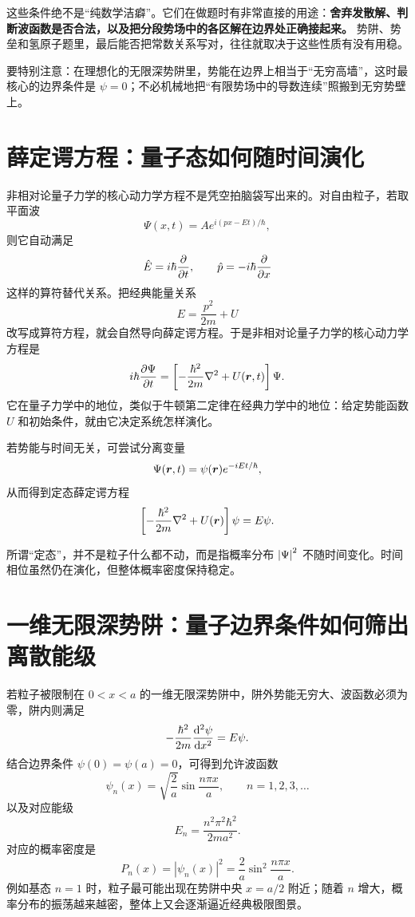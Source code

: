 \documentclass[lang=cn,11pt]{elegantbook}
\begin{document}
这些条件绝不是“纯数学洁癖”。它们在做题时有非常直接的用途：\textbf{舍弃发散解、判断波函数是否合法，以及把分段势场中的各区解在边界处正确接起来。} 势阱、势垒和氢原子题里，最后能否把常数关系写对，往往就取决于这些性质有没有用稳。

\begin{note}
要特别注意：在理想化的无限深势阱里，势能在边界上相当于“无穷高墙”，这时最核心的边界条件是 \(\psi=0\)；不必机械地把“有限势场中的导数连续”照搬到无穷势壁上。
\end{note}

\section{薛定谔方程：量子态如何随时间演化}

非相对论量子力学的核心动力学方程不是凭空拍脑袋写出来的。对自由粒子，若取平面波
\[
\Psi(x,t)=A e^{i(px-Et)/\hbar},
\]
则它自动满足
\[
\hat E=i\hbar\pdv{}{t},
\qquad
\hat p=-i\hbar\pdv{}{x}
\]
这样的算符替代关系。把经典能量关系
\[
E=\frac{p^2}{2m}+U
\]
改写成算符方程，就会自然导向薛定谔方程。于是非相对论量子力学的核心动力学方程是
\[
i\hbar\pdv{\Psi}{t}
=\left[-\frac{\hbar^2}{2m}\nabla^2+U(\vb*{r},t)\right]\Psi.
\]
它在量子力学中的地位，类似于牛顿第二定律在经典力学中的地位：给定势能函数 \(U\) 和初始条件，就由它决定系统怎样演化。

若势能与时间无关，可尝试分离变量
\[
\Psi(\vb*{r},t)=\psi(\vb*{r})e^{-iEt/\hbar},
\]
从而得到定态薛定谔方程
\[
\left[-\frac{\hbar^2}{2m}\nabla^2+U(\vb*{r})\right]\psi=E\psi.
\]

\begin{remark}
所谓“定态”，并不是粒子什么都不动，而是指概率分布 \(\abs{\Psi}^2\) 不随时间变化。时间相位虽然仍在演化，但整体概率密度保持稳定。
\end{remark}

\section{一维无限深势阱：量子边界条件如何筛出离散能级}

若粒子被限制在 \(0<x<a\) 的一维无限深势阱中，阱外势能无穷大、波函数必须为零，阱内则满足
\[
-\frac{\hbar^2}{2m}\dv[2]{\psi}{x}=E\psi.
\]
结合边界条件 \(\psi(0)=\psi(a)=0\)，可得到允许波函数
\[
\psi_n(x)=\sqrt{\frac{2}{a}}\sin\frac{n\pi x}{a},
\qquad
n=1,2,3,\dots
\]
以及对应能级
\[
E_n=\frac{n^2\pi^2\hbar^2}{2ma^2}.
\]
对应的概率密度是
\[
P_n(x)=|\psi_n(x)|^2=\frac{2}{a}\sin^2\frac{n\pi x}{a}.
\]
例如基态 \(n=1\) 时，粒子最可能出现在势阱中央 \(x=a/2\) 附近；随着 \(n\) 增大，概率分布的振荡越来越密，整体上又会逐渐逼近经典极限图景。
\end{document}
